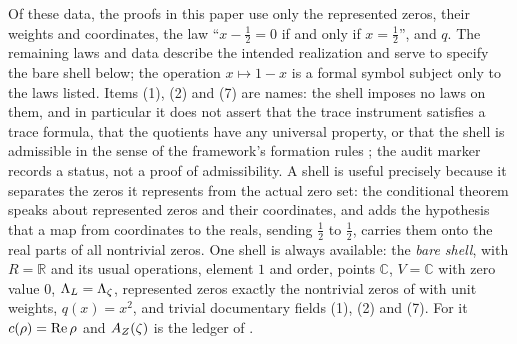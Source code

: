 Of these data, the proofs in this paper use only the represented zeros,
their weights and coordinates, the law ``\(x-\frac12=0\) if and only if
\(x=\frac12\)'', and \(q\).  The remaining laws and data describe the
intended realization and serve to specify the bare shell below; the
operation \(x\mapsto1-x\) is a formal symbol subject only to the laws
listed.  Items (1), (2) and (7) are names: the shell imposes no laws on them, and in particular
it does not assert that the trace instrument satisfies a trace formula,
that the quotients have any universal property, or that the shell is
admissible in the sense of the framework's formation rules
\citep{TsiokosFoundationsII2026}; the audit marker records a status,
not a proof of admissibility.  A shell is useful precisely because it
separates the zeros it represents from the actual zero set: the conditional theorem speaks about represented zeros and their
coordinates, and  adds the hypothesis that a
map from coordinates to the reals, sending \(\frac12\) to \(\frac12\),
carries them onto the real parts of all nontrivial zeros.  One shell is always available: the \emph{bare shell}, with
\(R=\mathbb R\) and its usual operations, element \(1\) and order, points
\(\mathbb C\), \(V=\mathbb C\) with zero value \(0\), \(\Lambda_L=\Lambda_{\zeta}\),
represented zeros exactly the nontrivial zeros of
 with unit weights, \(q(x)=x^2\),
and trivial documentary fields (1), (2) and (7).  For it
\(c(\rho)=\operatorname{Re}\rho\) and \(A_{Z}(\zeta)\) is the ledger of
.
